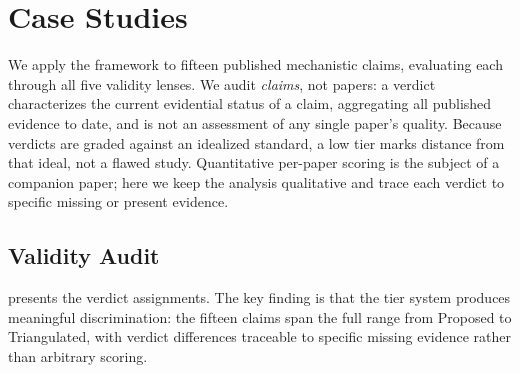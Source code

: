 \documentclass{article}
\begin{document}
\section{Case Studies}
\label{sec:case-studies}

We apply the framework to fifteen published mechanistic claims, evaluating each through all five validity lenses. We audit \emph{claims}, not papers: a verdict characterizes the current evidential status of a claim, aggregating all published evidence to date, and is not an assessment of any single paper's quality. Because verdicts are graded against an idealized standard, a low tier marks distance from that ideal, not a flawed study. Quantitative per-paper scoring is the subject of a companion paper; here we keep the analysis qualitative and trace each verdict to specific missing or present evidence.

\subsection{Validity Audit}

 presents the verdict assignments. The key finding is that the tier system produces meaningful discrimination: the fifteen claims span the full range from Proposed to Triangulated, with verdict differences traceable to specific missing evidence rather than arbitrary scoring.
\end{document}
